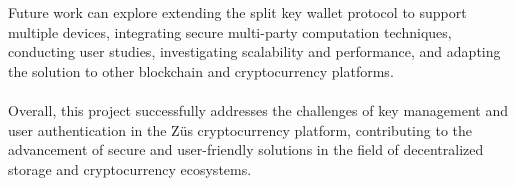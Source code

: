 Future work can explore extending the split key wallet protocol to support multiple devices, integrating secure multi-party computation techniques, conducting user studies, investigating scalability and performance, and adapting the solution to other blockchain and cryptocurrency platforms. \\  \\
Overall, this project successfully addresses the challenges of key management and user authentication in the Züs cryptocurrency platform, contributing to the advancement of secure and user-friendly solutions in the field of decentralized storage and cryptocurrency ecosystems.
\cleardoublepage
